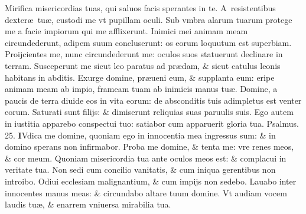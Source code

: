 \documentclass[a5paper,10pt]{book}
\def\ae{æ}
\begin{document}
\begin{multicols*}{2}
\newline \color{red} M\color{black}irifica misericordias tuas, qui saluos facis sperantes in te.
\newline \color{red} A\color{black}\ resistentibus dexter\ae \ tu\ae , custodi me vt pupillam oculi.
\newline \color{red} S\color{black}ub vmbra alarum tuarum protege me a facie impiorum qui me afflixerunt.
\newline \color{red} I\color{black}nimici mei animam meam circundederunt, adipem suum concluserunt: os eorum loquutum est superbiam.
\newline \color{red} P\color{black}roijcientes me, nunc circundederunt me: oculos suos statuerunt declinare in terram.
\newline \color{red} S\color{black}usceperunt me sicut leo paratus ad pr\ae dam, \& sicut catulus leonis habitans in abditis.
\newline \color{red} E\color{black}xurge domine, pr\ae ueni eum, \& supplanta eum: eripe animam meam ab impio, frameam tuam ab inimicis manus tu\ae .
\newline \color{red} D\color{black}omine, a paucis de terra diuide eos in vita eorum: de absconditis tuis adimpletus est venter eorum.
\newline \color{red} S\color{black}aturati sunt filijs: \& dimiserunt reliquias suas paruulis suis.
\newline \color{red} E\color{black}go autem in iustitia apparebo conspectui tuo: satiabor cum apparuerit gloria tua. \quad \color{red} Psalmus. 25.\color{black}
\vspace{-.5em}
\lettrine[lines=2]{\bfseries \color{red} I}{}Vdica me domine, quoniam ego in innocentia mea ingressus sum: \& in domino sperans non infirmabor.
\newline \color{red} P\color{black}roba me domine, \& tenta me: vre renes meos, \& cor meum.
\newline \color{red} Q\color{black}uoniam misericordia tua ante oculos meos est: \& complacui in veritate tua.
\newline \color{red} N\color{black}on sedi cum concilio vanitatis, \& cum iniqua gerentibus non introibo.
\newline \color{red} O\color{black}diui ecclesiam malignantium, \& cum impijs non sedebo.
\newline \color{red} L\color{black}auabo inter innocentes manus meas: \& circundabo altare tuum domine.
\newline \color{red} V\color{black}t audiam vocem laudis tu\ae , \& enarrem vniuersa mirabilia tua.%

\end{multicols*}
\end{document}
